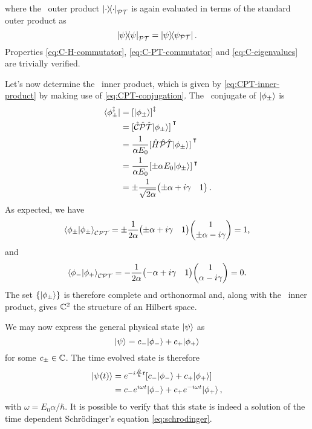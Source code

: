         where the \PT\ outer product $\dyad{\cdot}{\cdot}_{\PT}$ is again evaluated in terms of the standard outer product as 
        \begin{equation*}
            \dyad{\psi}{\psi}_{\PT} = \dyad{\psi}{\psi_{\PT}}
            \myperiod
        \end{equation*}
        Properties \eqref{eq:C-H-commutator}, \eqref{eq:C-PT-commutator} and \eqref{eq:C-eigenvalues} are trivially verified.

        Let's now determine the \CPT\ inner product, which is given by \eqref{eq:CPT-inner-product} by making use of \eqref{eq:CPT-conjugation}. The \CPT\ conjugate of $\ket{\phi_\pm}$ is
        \begin{align*}
            \bra*{\phi^\myconj_\pm}
            &= \bqty{\ket{\phi_\pm}}^\myconj \\
            &= \bqty*{\hCPT\!\ket{\phi_\pm}}^\intercal \\
            &= \frac{1}{\alpha E_0}\bqty*{\hH\hPT\!\ket{\phi_\pm}}^\intercal \\
            &= \frac{1}{\alpha E_0}\bqty*{\pm \alpha E_0 \! \ket{\phi_\pm}}^\intercal \\
            &= \pm\frac{1}{\sqrt{2\alpha}}\!\pmqty{\pm\alpha + i\gamma & 1}
            \myperiod
        \end{align*}
        As expected, we have
        \begin{equation}
            \braket{\phi_\pm}{\phi_\pm}_{\CPT} =  \pm\frac{1}{2\alpha}\!\pmqty{\pm\alpha + i\gamma & 1} \! \pmqty{1 \\ \pm\alpha - i \gamma} = 1
            \mycomma
        \end{equation}
        and
        \begin{equation}
            \braket{\phi_-}{\phi_+}_{\CPT} = -\frac{1}{2\alpha}\!\pmqty{-\alpha + i\gamma & 1}\!\pmqty{1 \\ \alpha - i \gamma} = 0
            \myperiod
        \end{equation}
        The set $\qty{\ket{\phi_\pm}}$ is therefore complete and orthonormal and, along with the \CPT\ inner product, gives $\mathbb{C}^2$ the structure of an Hilbert space.

        We may now express the general physical state $\ket{\psi}$ as 
        \begin{equation*}
            \ket{\psi} = c_{-}\!\ket{\phi_{-}} + c_{+}\!\ket{\phi_+}
        \end{equation*}
        for some $c_\pm\in\mathbb{C}$. The time evolved state is therefore
        \begin{align*}
            \ket{\psi\pqty{t}} 
            &= \myexp{-i\frac{\hH}{\hbar}t}\bqty*{c_{-}\!\ket{\phi_{-}} + c_{+}\!\ket{\phi_{+}}}\\
            &= c_{-}\myexp{i\omega t}\! \ket{\phi_{-}} + c_{+}\myexp{-i \omega t}\!\ket{\phi_{+}}
            \mycomma
        \end{align*}
        with $\omega = E_0 \alpha / \hbar$. It is possible to verify that this state is indeed a solution of the time dependent Schr\"odinger's equation \eqref{eq:schrodinger}.

